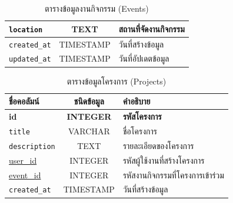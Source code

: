 \begin{table}[h]
\begin{adjustbox}{width=0.8\textwidth}
\begin{tabular}{|l|c|l|}
            \verb |location|         & TEXT             & สถานที่จัดงานกิจกรรม                       \\ \hline
            \verb |created_at|       & TIMESTAMP        & วันที่สร้างข้อมูล                            \\ \hline
            \verb |updated_at|       & TIMESTAMP        & วันที่อัปเดตข้อมูล                           \\ \hline
        \end{tabular}
    \end{adjustbox} %
    \caption{ตารางข้อมูลงานกิจกรรม (Events)}
    \label{tab:event_data}
\end{table}

\begin{table}[h]
    \centering
    \begin{tabular}{|l|c|l|}
        \hline
        ชื่อคอลัมน์               & ชนิดข้อมูล          & คำอธิบาย                     \\ \hline
        \textbf{id}           & \textbf{INTEGER} & \textbf{รหัสโครงการ}        \\ \hline
        \verb |title|         & VARCHAR          & ชื่อโครงการ                  \\ \hline
        \verb |description|   & TEXT             & รายละเอียดของโครงการ        \\ \hline
        \underline{user\_id}  & INTEGER          & รหัสผู้ใช้งานที่สร้างโครงการ      \\ \hline
        \underline{event\_id} & INTEGER          & รหัสงานกิจกรรมที่โครงการเข้าร่วม \\ \hline
        \verb |created_at|    & TIMESTAMP        & วันที่สร้างข้อมูล                \\ \hline
    \end{tabular}
    \caption{ตารางข้อมูลโครงการ (Projects)}
    \label{tab:project_data}
\end{table}


